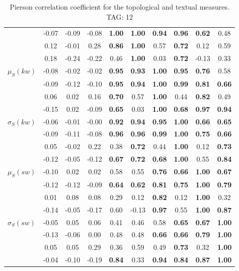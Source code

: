 \begin{table*}[h!]
\begin{center}
\begin{tabular}{| l || c | c | c | c | c | c | c | c | c |}
 & -0.07 & -0.09 & -0.08 & {\bf 1.00} & {\bf 1.00} & {\bf 0.94} & {\bf 0.96} & {\bf 0.62} & 0.48 \\
 & 0.12 & -0.01 & 0.28 & {\bf 0.86} & {\bf 1.00} & 0.57 & {\bf 0.72} & 0.12 & 0.59 \\
 & 0.18 & -0.24 & -0.22 & 0.46 & {\bf 1.00} & 0.03 & {\bf 0.72} & -0.13 & 0.33 \\\hline
$\mu_S(kw)$ & -0.08 & -0.02 & -0.02 & {\bf 0.95} & {\bf 0.93} & {\bf 1.00} & {\bf 0.95} & {\bf 0.76} & 0.58 \\
 & -0.09 & -0.12 & -0.10 & {\bf 0.95} & {\bf 0.94} & {\bf 1.00} & {\bf 0.99} & {\bf 0.81} & {\bf 0.66} \\
 & 0.06 & 0.02 & 0.16 & {\bf 0.70} & 0.57 & {\bf 1.00} & 0.44 & {\bf 0.82} & 0.49 \\
 & -0.15 & 0.02 & -0.09 & {\bf 0.65} & 0.03 & {\bf 1.00} & {\bf 0.68} & {\bf 0.97} & {\bf 0.94} \\\hline
$\sigma_S(kw)$ & -0.06 & -0.01 & -0.00 & {\bf 0.92} & {\bf 0.94} & {\bf 0.95} & {\bf 1.00} & {\bf 0.66} & {\bf 0.65} \\
 & -0.09 & -0.11 & -0.08 & {\bf 0.96} & {\bf 0.96} & {\bf 0.99} & {\bf 1.00} & {\bf 0.75} & {\bf 0.66} \\
 & 0.05 & -0.02 & 0.22 & 0.38 & {\bf 0.72} & 0.44 & {\bf 1.00} & 0.12 & {\bf 0.73} \\
 & -0.12 & -0.05 & -0.12 & {\bf 0.67} & {\bf 0.72} & {\bf 0.68} & {\bf 1.00} & 0.55 & {\bf 0.84} \\\hline
$\mu_S(sw)$ & -0.10 & 0.02 & 0.02 & 0.58 & 0.55 & {\bf 0.76} & {\bf 0.66} & {\bf 1.00} & {\bf 0.67} \\
 & -0.12 & -0.12 & -0.09 & {\bf 0.64} & {\bf 0.62} & {\bf 0.81} & {\bf 0.75} & {\bf 1.00} & {\bf 0.79} \\
 & 0.01 & 0.08 & 0.08 & 0.29 & 0.12 & {\bf 0.82} & 0.12 & {\bf 1.00} & 0.32 \\
 & -0.14 & -0.05 & -0.17 & 0.60 & -0.13 & {\bf 0.97} & 0.55 & {\bf 1.00} & {\bf 0.87} \\\hline
$\sigma_S(sw)$ & -0.05 & 0.05 & 0.06 & 0.41 & 0.46 & 0.58 & {\bf 0.65} & {\bf 0.67} & {\bf 1.00} \\
 & -0.13 & -0.06 & 0.00 & 0.48 & 0.48 & {\bf 0.66} & {\bf 0.66} & {\bf 0.79} & {\bf 1.00} \\
 & 0.05 & 0.05 & 0.29 & 0.36 & 0.59 & 0.49 & {\bf 0.73} & 0.32 & {\bf 1.00} \\
 & -0.04 & -0.10 & -0.19 & {\bf 0.84} & 0.33 & {\bf 0.94} & {\bf 0.84} & {\bf 0.87} & {\bf 1.00} \\\hline
\end{tabular}
\caption{Pierson correlation coefficient for the topological and textual measures. TAG: 12}
\end{center}
\end{table*}